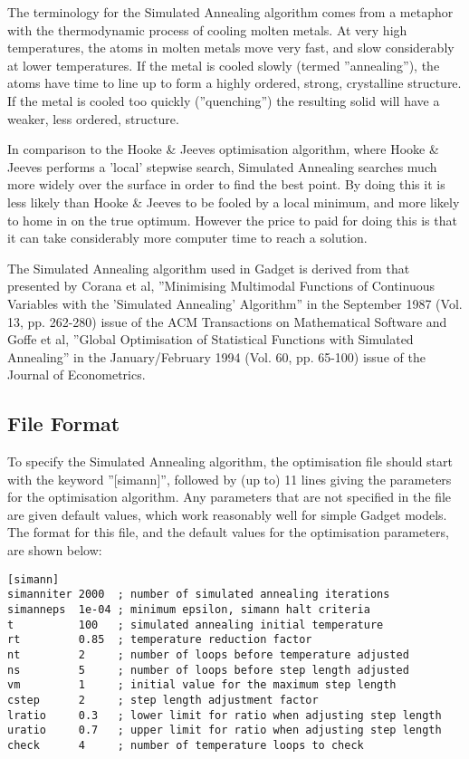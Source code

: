\documentclass[10pt,twoside]{book}
\begin{document}
\bigskip
The terminology for the Simulated Annealing algorithm comes from a metaphor with the thermodynamic process of cooling molten metals.  At very high temperatures, the atoms in molten metals move very fast, and slow considerably at lower temperatures.  If the metal is cooled slowly (termed ''annealing''), the atoms have time to line up to form a highly ordered, strong, crystalline structure.  If the metal is cooled too quickly (''quenching'') the resulting solid will have a weaker, less ordered, structure.

\bigskip
In comparison to the Hooke \& Jeeves optimisation algorithm, where Hooke \& Jeeves performs a 'local' stepwise search, Simulated Annealing searches much more widely over the surface in order to find the best point.  By doing this it is less likely than Hooke \& Jeeves to be fooled by a local minimum, and more likely to home in on the true optimum.  However the price to paid for doing this is that it can take considerably more computer time to reach a solution.

\bigskip
The Simulated Annealing algorithm used in Gadget is derived from that presented by Corana et al, ''Minimising Multimodal Functions of Continuous Variables with the 'Simulated Annealing' Algorithm'' in the September 1987 (Vol. 13, pp. 262-280) issue of the ACM Transactions on Mathematical Software and Goffe et al, ''Global Optimisation of Statistical Functions with Simulated Annealing'' in the January/February 1994 (Vol. 60, pp. 65-100) issue of the Journal of Econometrics.

\subsection{File Format}\label{subsec:simannfile}
To specify the Simulated Annealing algorithm, the optimisation file should start with the keyword ''[simann]'', followed by (up to) 11 lines giving the parameters for the optimisation algorithm.  Any parameters that are not specified in the file are given default values, which work reasonably well for simple Gadget models.  The format for this file, and the default values for the optimisation parameters, are shown below:

{\small\begin{verbatim}
[simann]
simanniter 2000  ; number of simulated annealing iterations
simanneps  1e-04 ; minimum epsilon, simann halt criteria
t          100   ; simulated annealing initial temperature
rt         0.85  ; temperature reduction factor
nt         2     ; number of loops before temperature adjusted
ns         5     ; number of loops before step length adjusted
vm         1     ; initial value for the maximum step length
cstep      2     ; step length adjustment factor
lratio     0.3   ; lower limit for ratio when adjusting step length
uratio     0.7   ; upper limit for ratio when adjusting step length
check      4     ; number of temperature loops to check
\end{verbatim}}
\end{document}
